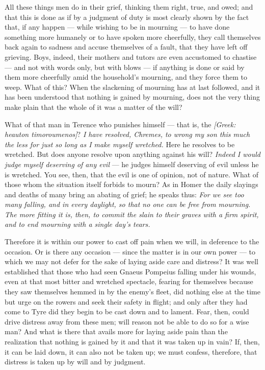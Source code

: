 All these things men do in their grief, thinking them right, true, and owed; and that this is done as if by a judgment of duty is most clearly shown by the fact that, if any happen — while wishing to be in mourning — to have done something more humanely or to have spoken more cheerfully, they call themselves back again to sadness and accuse themselves of a fault, that they have left off grieving. Boys, indeed, their mothers and tutors are even accustomed to chastise — and not with words only, but with blows — if anything is done or said by them more cheerfully amid the household's mourning, and they force them to weep. What of this? When the slackening of mourning has at last followed, and it has been understood that nothing is gained by mourning, does not the very thing make plain that the whole of it was a matter of the will?

 What of that man in Terence who punishes himself — that is, the \textit{[Greek: heauton timoroumenos]}? \textit{I have resolved, Chremes, to wrong my son this much the less for just so long as I make myself wretched.} Here he resolves to be wretched. But does anyone resolve upon anything against his will? \textit{Indeed I would judge myself deserving of any evil} — he judges himself deserving of evil unless he is wretched. You see, then, that the evil is one of opinion, not of nature. What of those whom the situation itself forbids to mourn? As in Homer the daily slayings and deaths of many bring an abating of grief; he speaks thus: \textit{For we see too many falling, and in every daylight, so that no one can be free from mourning. The more fitting it is, then, to commit the slain to their graves with a firm spirit, and to end mourning with a single day's tears.}

 Therefore it is within our power to cast off pain when we will, in deference to the occasion. Or is there any occasion — since the matter is in our own power — to which we may not defer for the sake of laying aside care and distress? It was well established that those who had seen Gnaeus Pompeius falling under his wounds, even at that most bitter and wretched spectacle, fearing for themselves because they saw themselves hemmed in by the enemy's fleet, did nothing else at the time but urge on the rowers and seek their safety in flight; and only after they had come to Tyre did they begin to be cast down and to lament. Fear, then, could drive distress away from these men; will reason not be able to do so for a wise man? And what is there that avails more for laying aside pain than the realization that nothing is gained by it and that it was taken up in vain? If, then, it can be laid down, it can also not be taken up; we must confess, therefore, that distress is taken up by will and by judgment.

